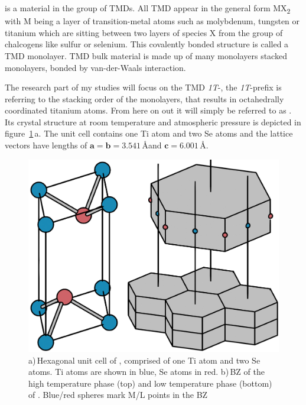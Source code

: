 \ts\space is a material in the group of \acp{TMD}.
All \ac{TMD} appear in the general form MX\textsubscript{2} with M being a layer of transition-metal atoms such as molybdenum, tungsten or titanium which are sitting between two layers of species X from the group of chalcogens like sulfur or selenium.
This covalently bonded structure is called a \ac{TMD} monolayer.
\Ac{TMD} bulk material is made up of many monolayers stacked monolayers, bonded by van-der-Waals interaction.

The research part of my studies will focus on the \ac{TMD} \textit{1T}-\ts, the \textit{1T}-prefix is referring to the stacking order of the monolayers, that results in octahedrally coordinated titanium atoms.
From here on out it will simply be referred to as \ts.
Its crystal structure at room temperature and atmospheric pressure is depicted in figure~\ref{fig:crystal}\,a.
The unit cell contains one Ti atom and two Se atoms and the lattice vectors have lengths of $\mathbf{a}=\mathbf{b}=3.541$\,\AA\space and $\mathbf{c}=6.001$\,\AA\cite{patel1983}.

\begin{figure}[!t]
	\begin{minipage}{0.5\columnwidth}
		\includegraphics[width=\columnwidth]{figs/tise2_crystal.png}
	\end{minipage}
	\hspace{0.04\columnwidth}
	\begin{minipage}{0.45\columnwidth}
		\caption{a)\,Hexagonal unit cell of \ts, comprised of one Ti atom and two Se atoms. Ti atoms are shown in blue, Se atoms in red. b)\,\ac{BZ} of the high temperature phase (top) and low temperature phase (bottom) of \ts. Blue/red spheres mark M/L points in the \ac{BZ}}
		\label{fig:crystal}
	\end{minipage}
\end{figure}

